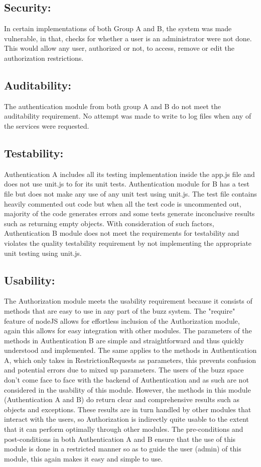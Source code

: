 \subsection{Security:}
In certain implementations of both  Group A and B, the system was made vulnerable, in that, checks for whether a user is an administrator were not done. This would allow any user, authorized or not, to access, remove or edit the authorization restrictions.

\subsection{Auditability:}
The authentication module from both group A and B do not meet the auditability requirement. No attempt was made to write to log files when any of the services were requested.

\subsection{Testability:}
Authentication A includes all its testing implementation inside the app.js file and does not use unit.js to for its unit tests.  
Authentication module for B has a test file but does not make any use of any unit test using unit.js. The test file contains heavily commented out code but when all the test code is uncommented out, majority of the code generates errors and some tests generate inconclusive results such as returning empty objects. With consideration of such factors, Authentication B module does not meet the requirements for testability and violates the quality testability requirement by not implementing the appropriate unit testing using unit.js.

\subsection{Usability:}
The Authorization module meets the usability requirement because it consists
of methods that are easy to use in any part of the buzz system.
The "require" feature of nodeJS allows for effortless inclusion of the Authorization 
module, again this allows for easy integration with other modules.
The parameters of the methods in Authentication B are simple and straightforward and thus
quickly understood and implemented. The same applies to the methods in Authentication A, 
which only takes in RestrictionRequests as parameters, this prevents confusion and potential
errors due to mixed up parameters. 
The users of the buzz space don't come face to face with the backend of Authentication and as 
such are not considered in the usability of this module. However, the methods in this module
(Authentication A and B) do return clear and comprehensive results such as objects and exceptions. 
These results are in turn handled by other modules that interact with the users, so Authorization 
is indirectly quite usable to the extent that it can perform optimally through other modules.
The pre-conditions and post-conditions in both Authentication A and B ensure that the use of this 
module is done in a restricted manner so as to guide the user (admin) of this module, this again
makes it easy and simple to use.

